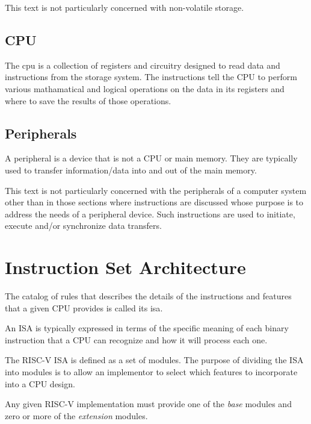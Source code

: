 This text is not particularly concerned with non-volatile storage. 

\subsection{CPU}

The \acrshort{cpu} is a collection of registers and circuitry designed
to read data and instructions from the storage system.  The instructions
tell the CPU to perform various mathamatical and logical operations on 
the data in its registers and where to save the results of those operations.

\subsection{Peripherals}

A peripheral is a device that is not a CPU or main memory.  They are 
typically used to transfer information/data into and out of the 
main memory.

This text is not particularly concerned with the peripherals of a computer
system other than in those sections where instructions are discussed 
whose purpose is to address the needs of a peripheral device.  Such
instructions are used to initiate, execute and/or synchronize data transfers.


\section{Instruction Set Architecture}

The catalog of rules that describes the details of the instructions 
and features that a given CPU provides is called its \acrfull{isa}.

An ISA is typically expressed in terms of the specific meaning of
each binary instruction that a CPU can recognize and how it will
process each one.

The RISC-V ISA is defined as a set of modules.  The purpose of
dividing the ISA into modules is to allow an implementor to select which 
features to incorporate into a CPU design.

Any given RISC-V implementation must provide one of the {\em base}
modules and zero or more of the {\em extension} modules.

